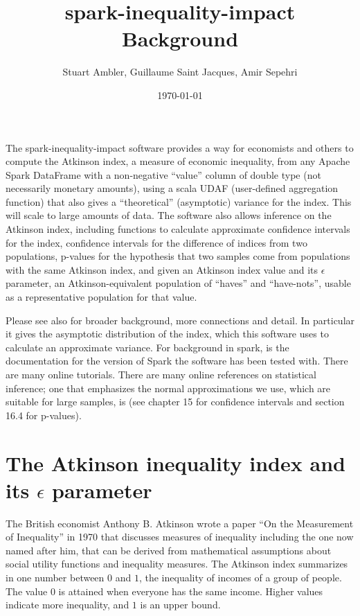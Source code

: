 \documentclass[11pt, oneside]{article}  %
\title{spark-inequality-impact Background}
\author{Stuart Ambler, Guillaume Saint Jacques, Amir Sepehri}
\date{\today}
\begin{document}
\maketitle
\tableofcontents

The spark-inequality-impact software provides a way for economists and others to compute the Atkinson index, a measure of economic inequality, from any Apache Spark DataFrame with a non-negative ``value'' column of double type (not necessarily monetary amounts), using a scala UDAF (user-defined aggregation function) that also gives a ``theoretical'' (asymptotic) variance for the index.  This will scale to large amounts of data.  The software also allows inference on the Atkinson index, including functions to calculate approximate confidence intervals for the index, confidence intervals for the difference of indices from two populations, p-values for the hypothesis that two samples come from populations with the same Atkinson index, and given an Atkinson index value and its $\epsilon$ parameter, an Atkinson-equivalent population of ``haves'' and ``have-nots'', usable as a representative population for that value.

Please see also \cite{SaintJacques} for broader background, more connections and detail.  In particular it gives the asymptotic distribution of the index, which this software uses to calculate an approximate variance.  For background in spark, \cite{Spark} is the documentation for the version of Spark the software has been tested with.  There are many online tutorials.  There are many online references on statistical inference; one that emphasizes the normal approximations we use, which are suitable for large samples, is \cite{Matloff} (see chapter 15 for confidence intervals and section 16.4 for p-values).

\section{The Atkinson inequality index and its $\epsilon$ parameter}

The British economist Anthony B. Atkinson wrote a paper ``On the Measurement of Inequality'' \cite{Atkinson} in 1970 that discusses measures of inequality including the one now named after him, that can be derived from mathematical assumptions about social utility functions and inequality measures.  The Atkinson index summarizes in one number between $0$ and $1$, the inequality of incomes of a group of people.  The value $0$ is attained when everyone has the same income.  Higher values indicate more inequality, and $1$ is an upper bound.
\end{document}
